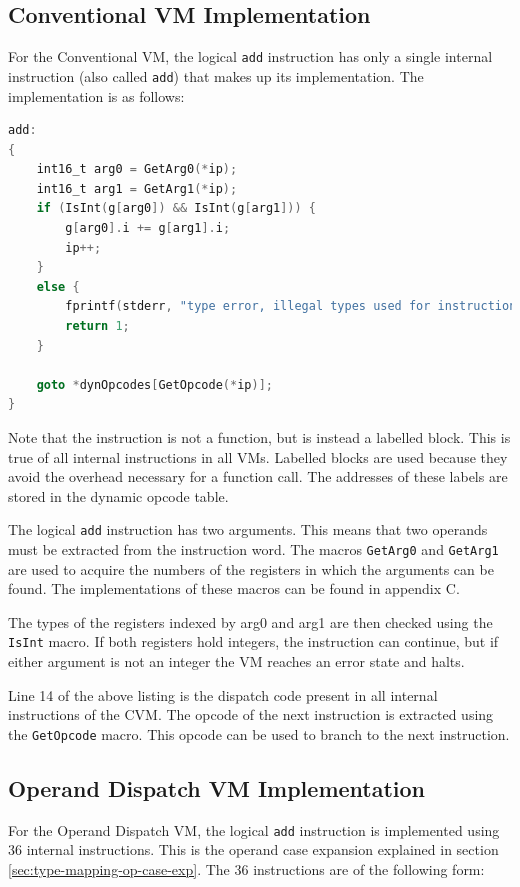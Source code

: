 \documentclass[english,a4paper,12pt]{report}
\begin{document}
\subsection{Conventional VM Implementation}

For the Conventional VM, the logical \verb|add| instruction has only a
single internal instruction (also called \verb|add|) that makes up its
implementation. The implementation is as follows:

\begin{lstlisting}[language=C]
add:
{
    int16_t arg0 = GetArg0(*ip);
    int16_t arg1 = GetArg1(*ip);
    if (IsInt(g[arg0]) && IsInt(g[arg1])) {
        g[arg0].i += g[arg1].i;
        ip++;
    }
    else {
        fprintf(stderr, "type error, illegal types used for instruction: add");
        return 1;
    }

    goto *dynOpcodes[GetOpcode(*ip)];
}
\end{lstlisting}

Note that the instruction is not a function, but is instead a labelled
block. This is true of all internal instructions in all VMs. Labelled
blocks are used because they avoid the overhead necessary for a
function call. The addresses of these labels are stored in the dynamic
opcode table.

The logical \verb|add| instruction has two arguments. This means that
two operands must be extracted from the instruction word. The macros
\verb|GetArg0| and \verb|GetArg1| are used to acquire the numbers of
the registers in which the arguments can be found. The implementations
of these macros can be found in appendix C.

The types of the registers indexed by arg0 and arg1 are then checked
using the \verb|IsInt| macro. If both registers hold integers, the
instruction can continue, but if either argument is not an integer the
VM reaches an error state and halts.

Line 14 of the above listing is the dispatch code present in all
internal instructions of the CVM. The opcode of the next instruction
is extracted using the \verb|GetOpcode| macro. This opcode can be used to
branch to the next instruction. 

\subsection{Operand Dispatch VM Implementation}
\label{sec:operand-dispatch-implementation}

For the Operand Dispatch VM, the logical \verb|add| instruction is
implemented using 36 internal instructions. This is the operand case
expansion explained in section \ref{sec:type-mapping-op-case-exp}. The
36 instructions are of the following form:
\end{document}

